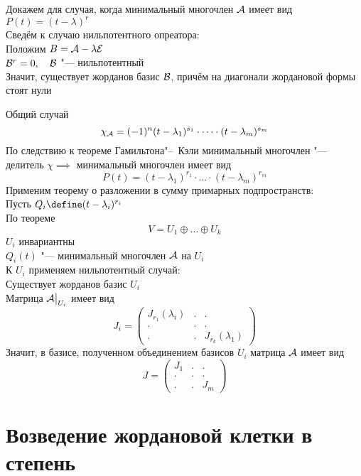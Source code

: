 \begin{iproof}
	\item Докажем для случая, когда минимальный многочлен $ \mathcal{A} $ имеет вид $ P(t) = (t - \lambda)^r $ \\
	Сведём к случаю нильпотентного опреатора: \\
	Положим $ B = \mathcal{A} - \lambda\mathcal{E} $ \\
	$ \mathcal{B}^r = 0, \quad \mathcal{B} $ "--- нильпотентный \\
	Значит, существует жорданов базис $ \mathcal{B} $, причём на диагонали жордановой формы стоят нули
	\item Общий случай
	$$ \chi_{\mathcal{A}} = (-1)^n(t - \lambda_1)^{s_1} \cdot \dots \cdot (t - \lambda_m)^{s_m} $$
	По следствию к теореме Гамильтона"--~Кэли минимальный многочлен "--- делитель $ \chi \implies $ минимальный многочлен имеет вид
	$$ P(t) = (t - \lambda_1)^{r_1} \cdot \dots \cdot (t - \lambda_m)^{r_m} $$
	Применим теорему о разложении в сумму примарных подпространств: \\
	Пусть $ Q_i \define (t - \lambda_i)^{r_i} $ \\
	По теореме
	$$ V = U_1 \oplus \dots \oplus U_k $$
	$ U_i $ инвариантны \\
	$ Q_i(t) $ "--- минимальный многочлен $ \mathcal{A} $ на $ U_i $ \\
	К $ U_i $ применяем нильпотентный случай: \\
	Существует жорданов базис $ U_i $ \\
	Матрица $ \mathcal{A}\big|_{U_i}^{} $ имеет вид
	$$ J_i =
	\begin{pmatrix}
		J_{r_1}(\lambda_i) & . & . \\
		. & . & . \\
		. & . & J_{r_k}(\lambda_1)
	\end{pmatrix} $$
	Значит, в базисе, полученном объединением базисов $ U_i $ матрица $ \mathcal{A} $ имеет вид
	$$ J =
	\begin{pmatrix}
		J_1 & . & . \\
		. & . & . \\
		. & . & J_m
	\end{pmatrix} $$
\end{iproof}

\section{Возведение жордановой клетки в степень}

